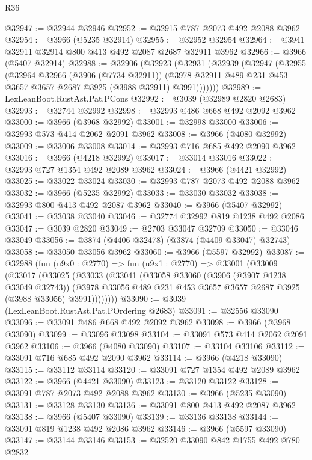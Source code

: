 \begin{lexlean}{R36}
\begin{coremodule}
@32947 := @32944 @32946
@32952 := @32915 @787 @2073 @492 @2088 @3962
@32954 := @3966 (@5235 @32914)
@32955 := @32952 @32954
@32964 := @3941 @32911 @32914 @800 @413 @492 @2087 @2687 @32911 @3962
@32966 := @3966 (@5407 @32914)
@32988 := @32906
    (@32923
      (@32931
        (@32939
          (@32947
            (@32955
              (@32964
                @32966
                (@3906 (@7734 @32911))
                (@3978 @32911 @489 @231 @453 @3657 @3657 @2687 @3925 (@3988 @32911) @3991)))))))
@32989 := LexLeanBoot.RustAst.Pat.PCons
@32992 := @3039 (@32989 @2820 @2683)
@32993 := @32744 @32992
@32998 := @32993 @486 @668 @492 @2092 @3962
@33000 := @3966 (@3968 @32992)
@33001 := @32998 @33000
@33006 := @32993 @573 @414 @2062 @2091 @3962
@33008 := @3966 (@4080 @32992)
@33009 := @33006 @33008
@33014 := @32993 @716 @685 @492 @2090 @3962
@33016 := @3966 (@4218 @32992)
@33017 := @33014 @33016
@33022 := @32993 @727 @1354 @492 @2089 @3962
@33024 := @3966 (@4421 @32992)
@33025 := @33022 @33024
@33030 := @32993 @787 @2073 @492 @2088 @3962
@33032 := @3966 (@5235 @32992)
@33033 := @33030 @33032
@33038 := @32993 @800 @413 @492 @2087 @3962
@33040 := @3966 (@5407 @32992)
@33041 := @33038 @33040
@33046 := @32774 @32992 @819 @1238 @492 @2086
@33047 := @3039 @2820
@33049 := @2703 @33047 @32709
@33050 := @33046 @33049
@33056 := @3874 (@4406 @32478) (@3874 (@4409 @33047) @32743)
@33058 := @33050 @33056 @3962
@33060 := @3966 (@5597 @32992)
@33087 := @32988
    (fun (u9x0 : @2770) =>
    fun (u9x1 : @2770) =>
    @33001
      (@33009
        (@33017
          (@33025
            (@33033
              (@33041
                (@33058
                  @33060
                  (@3906 (@3907 @1238 @33049 @32743))
                  (@3978 @33056 @489 @231 @453 @3657 @3657 @2687 @3925 (@3988 @33056) @3991))))))))
@33090 := @3039 (LexLeanBoot.RustAst.Pat.POrdering @2683)
@33091 := @32556 @33090
@33096 := @33091 @486 @668 @492 @2092 @3962
@33098 := @3966 (@3968 @33090)
@33099 := @33096 @33098
@33104 := @33091 @573 @414 @2062 @2091 @3962
@33106 := @3966 (@4080 @33090)
@33107 := @33104 @33106
@33112 := @33091 @716 @685 @492 @2090 @3962
@33114 := @3966 (@4218 @33090)
@33115 := @33112 @33114
@33120 := @33091 @727 @1354 @492 @2089 @3962
@33122 := @3966 (@4421 @33090)
@33123 := @33120 @33122
@33128 := @33091 @787 @2073 @492 @2088 @3962
@33130 := @3966 (@5235 @33090)
@33131 := @33128 @33130
@33136 := @33091 @800 @413 @492 @2087 @3962
@33138 := @3966 (@5407 @33090)
@33139 := @33136 @33138
@33144 := @33091 @819 @1238 @492 @2086 @3962
@33146 := @3966 (@5597 @33090)
@33147 := @33144 @33146
@33153 := @32520 @33090 @842 @1755 @492 @780 @2832

\end{coremodule}
\end{lexlean}
